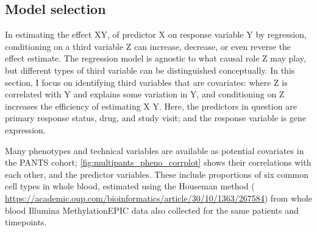 \begin{outline}
\subsection{Model selection}

In estimating the effect X\textrightarrow Y, of predictor X on response variable Y by regression, 
conditioning on a third variable Z can increase, decrease, or even reverse the effect estimate.
The regression model is agnostic to what causal role Z may play,
but different types of third variable can be distinguished conceptually.
In this section, I focus on identifying third variables that are covariates:
where Z is correlated with Y and explains some variation in Y,
and conditioning on Z increases the efficiency of estimating X \textrightarrow Y.
Here, the predictors in question are primary response status, drug, and study visit; and the response variable is gene expression.

Many phenotypes and technical variables are available as potential covariates in the \gls{PANTS} cohort;
\autoref{fig:multipants_pheno_corrplot} shows their correlations with each other, and the predictor variables.
These include proportions of six common cell types in whole blood, 
estimated using the Houseman method ( \url{https://academic.oup.com/bioinformatics/article/30/10/1363/267584}) 
from whole blood Illumina MethylationEPIC data also collected for the same patients and timepoints.


\end{outline}
